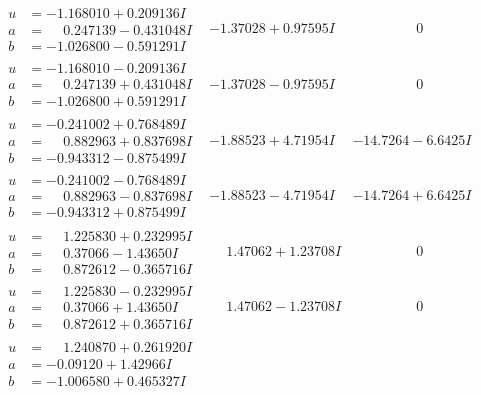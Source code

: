 \documentclass[1p]{elsarticle_modified}
\theoremstyle{definition}
\begin{document}
$$\begin{array}{c|c|c}
\begin{aligned}
u &= -1.168010 + 0.209136 I \\
a &= \phantom{-}0.247139 - 0.431048 I \\
b &= -1.026800 - 0.591291 I\end{aligned}
 & -1.37028 + 0.97595 I & \phantom{-0.000000 } 0 \\ \hline\begin{aligned}
u &= -1.168010 - 0.209136 I \\
a &= \phantom{-}0.247139 + 0.431048 I \\
b &= -1.026800 + 0.591291 I\end{aligned}
 & -1.37028 - 0.97595 I & \phantom{-0.000000 } 0 \\ \hline\begin{aligned}
u &= -0.241002 + 0.768489 I \\
a &= \phantom{-}0.882963 + 0.837698 I \\
b &= -0.943312 - 0.875499 I\end{aligned}
 & -1.88523 + 4.71954 I & -14.7264 - 6.6425 I \\ \hline\begin{aligned}
u &= -0.241002 - 0.768489 I \\
a &= \phantom{-}0.882963 - 0.837698 I \\
b &= -0.943312 + 0.875499 I\end{aligned}
 & -1.88523 - 4.71954 I & -14.7264 + 6.6425 I \\ \hline\begin{aligned}
u &= \phantom{-}1.225830 + 0.232995 I \\
a &= \phantom{-}0.37066 - 1.43650 I \\
b &= \phantom{-}0.872612 - 0.365716 I\end{aligned}
 & \phantom{-}1.47062 + 1.23708 I & \phantom{-0.000000 } 0 \\ \hline\begin{aligned}
u &= \phantom{-}1.225830 - 0.232995 I \\
a &= \phantom{-}0.37066 + 1.43650 I \\
b &= \phantom{-}0.872612 + 0.365716 I\end{aligned}
 & \phantom{-}1.47062 - 1.23708 I & \phantom{-0.000000 } 0 \\ \hline\begin{aligned}
u &= \phantom{-}1.240870 + 0.261920 I \\
a &= -0.09120 + 1.42966 I \\
b &= -1.006580 + 0.465327 I\end{aligned}

\end{array}$$
\end{document}

